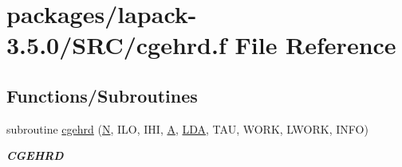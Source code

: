 \hypertarget{cgehrd_8f}{}\section{packages/lapack-\/3.5.0/\+S\+R\+C/cgehrd.f File Reference}
\label{cgehrd_8f}
\subsection*{Functions/\+Subroutines}
\begin{DoxyCompactItemize}
\item 
subroutine \hyperlink{group__complexGEcomputational_ga28cec12d94bb8978d75179b26a74adb2}{cgehrd} (\hyperlink{polmisc_8c_a0240ac851181b84ac374872dc5434ee4}{N}, I\+L\+O, I\+H\+I, \hyperlink{classA}{A}, \hyperlink{example__user_8c_ae946da542ce0db94dced19b2ecefd1aa}{L\+D\+A}, T\+A\+U, W\+O\+R\+K, L\+W\+O\+R\+K, I\+N\+F\+O)
\begin{DoxyCompactList}\small\item\em {\bfseries C\+G\+E\+H\+R\+D} \end{DoxyCompactList}\end{DoxyCompactItemize}
